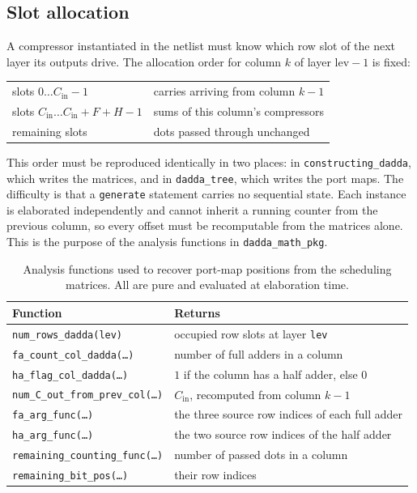\documentclass[11pt,a4paper]{article}
\begin{document}
\subsection{Slot allocation}

A compressor instantiated in the netlist must know which row slot of the next
layer its outputs drive. The allocation order for column $k$ of layer
$\mathrm{lev}-1$ is fixed:

\begin{center}\small
\begin{tabular}{@{}ll@{}}
\toprule
slots $0 \ldots C_{\mathrm{in}}-1$ & carries arriving from column $k-1$ \\
slots $C_{\mathrm{in}} \ldots C_{\mathrm{in}}+F+H-1$ & sums of this column's compressors \\
remaining slots & dots passed through unchanged \\
\bottomrule
\end{tabular}
\end{center}

This order must be reproduced identically in two places: in
\texttt{constructing\_dadda}, which writes the matrices, and in
\texttt{dadda\_tree}, which writes the port maps. The difficulty is that a
\texttt{generate} statement carries no sequential state. Each instance is
elaborated independently and cannot inherit a running counter from the previous
column, so every offset must be recomputable from the matrices alone. This is
the purpose of the analysis functions in \texttt{dadda\_math\_pkg}.

\begin{table}[!ht]
\centering\small
\begin{tabular}{@{}ll@{}}
\toprule
\textbf{Function} & \textbf{Returns} \\
\midrule
\texttt{num\_rows\_dadda(lev)}                & occupied row slots at layer \texttt{lev} \\
\texttt{fa\_count\_col\_dadda(\ldots)}        & number of full adders in a column \\
\texttt{ha\_flag\_col\_dadda(\ldots)}         & $1$ if the column has a half adder, else $0$ \\
\texttt{num\_C\_out\_from\_prev\_col(\ldots)} & $C_{\mathrm{in}}$, recomputed from column $k-1$ \\
\texttt{fa\_arg\_func(\ldots)}                & the three source row indices of each full adder \\
\texttt{ha\_arg\_func(\ldots)}                & the two source row indices of the half adder \\
\texttt{remaining\_counting\_func(\ldots)}    & number of passed dots in a column \\
\texttt{remaining\_bit\_pos(\ldots)}          & their row indices \\
\bottomrule
\end{tabular}
\caption{Analysis functions used to recover port-map positions from the
scheduling matrices. All are pure and evaluated at elaboration time.}
\label{tab:helpers}
\end{table}
\end{document}
